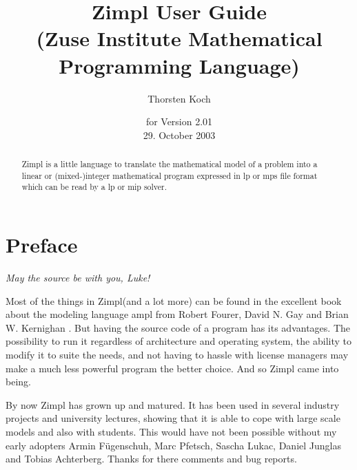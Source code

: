 \documentclass[12pt]{article}
\newcommand{\zimpl}{{\sc Zimpl}\xspace}
\newcommand{\lp}{{\sc lp}\xspace}
\newcommand{\mip}{{\sc mip}\xspace}
\newcommand{\mps}{{\sc mps}\xspace}
\newcommand{\lpf}{{\sc lp}\xspace}
\newcommand{\ampl}{{\sc ampl}\xspace}
\newcommand{\ilog}{{\sc ilog}\xspace}
\newcommand{\cplex}{{\sc cplex}\xspace}
\begin{document}

\title{
\LARGE\zimpl User Guide\\
\normalsize (Zuse Institute Mathematical Programming Language)}
\author{Thorsten Koch}
\date{\small for Version 2.01\\29. October 2003}
\maketitle
\vfill
\tableofcontents
\newpage
\begin{abstract}
\zimpl is a little language to translate the mathematical model of a 
problem into a linear or (mixed-)integer mathematical program
expressed in \lpf or \mps file format which can be read
by a \lp or \mip solver.
\end{abstract}
\section{Preface}
\begin{flushright}
{\em May the source be with you, Luke!}
\end{flushright}
Most of the things in \zimpl (and a lot more) can be found in 
the excellent book about the modeling language \ampl 
from Robert Fourer, David N. Gay and Brian W. Kernighan
\cite{FourierGrayKernighan2003}.
But having the source code of a program has its advantages. The
possibility to run it regardless of architecture and operating system, the
ability to modify it to suite the needs, and not having to hassle with license
managers may make a much less powerful program the better choice.
And so \zimpl came into being.

\bigskip
By now \zimpl has grown up and matured. It has been used in several
industry projects and university lectures, showing that it is able to
cope with large scale models and also with students.
This would have not been possible without my early adopters 
Armin F\"ugenschuh, Marc Pfetsch, Sascha Lukac, Daniel Junglas
and Tobias Achterberg. Thanks for there comments and bug reports.
\end{document}
